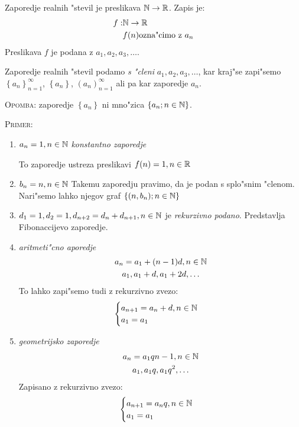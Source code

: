  Zaporedje realnih "stevil je preslikava $\mathbb{N} \rightarrow \mathbb{R}$. Zapis je:
\begin{align*}
f: &\mathbb{N} \rightarrow \mathbb{R}\\
&f(n) \text{ozna"cimo z $a_n$}
\end{align*}
Preslikava $f$ je podana z $a_1, a_2, a_3, \ldots$.

Zaporedje realnih "stevil podamo \emph{s "cleni} $a_1, a_2, a_3, \ldots$, kar kraj"se zapi"semo $\left\{a_n\right\}_{n=1}^\infty$, $\left\{a_n\right\}$,  $\left(a_n\right)_{n=1}^\infty$ ali pa kar zaporedje $a_n$.

\textsc{Opomba}: zaporedje $\left\{a_n\right\}$ ni mno"zica $\left\{a_n; n \in \mathbb{N} \right\}$.

\textsc{Primer:}
\begin{enumerate}[1)]
	\item $a_n = 1, n \in \mathbb{N}$ \emph{konstantno zaporedje}
	
	To zaporedje ustreza preslikavi $f(n) = 1, n \in \mathbb{R}$
	
	\item $b_n = n, n \in \mathbb{N}$ Takemu zaporedju pravimo, da je podan s splo"snim "clenom. Nari"semo lahko njegov graf $\left\{(n, b_n); n \in \mathbb{N} \right\}$
	
	\item $d_1=1, d_2=1, d_{n+2} = d_n + d_{n+1}, n \in \mathbb{N}$ je \emph{rekurzivno podano}. Predstavlja Fibonaccijevo zaporedje.
	
	\item \emph{aritmeti"cno aporedje}
	\begin{gather*}
	a_n = a_1 + (n-1)d, n \in \mathbb{N}\\
	a_1, a_1 + d, a_1 + 2d, \ldots
	\end{gather*}
	To lahko zapi"semo tudi z  rekurzivno zvezo:
	\begin{equation*}
	\begin{cases}
	a_{n+1} = a_n + d, n \in \mathbb{N}\\
	a_1 = a_1
	\end{cases}
	\end{equation*}
	
	\item \emph{geometrijsko zaporedje}
	\begin{gather*}
		a_n = a_1 q{n-1}, n \in \mathbb{N}\\
		a_1, a_1 q, a_1 q^2, \ldots
	\end{gather*}
	Zapisano z rekurzivno zvezo:
	\begin{equation*}
	\begin{cases}
	a_{n+1} = a_n q, n \in \mathbb{N} \\
	a_1 = a_1
	\end{cases}
	\end{equation*}
\end{enumerate}

